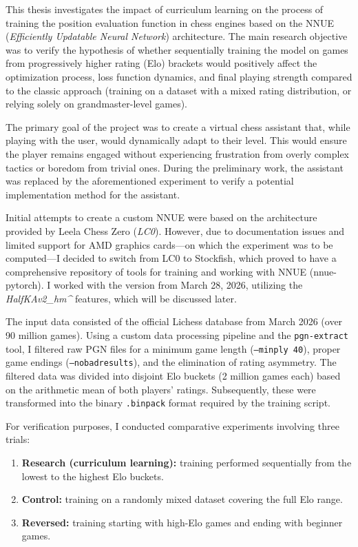 \documentclass[12pt,a4paper]{report}
\begin{document}
This thesis investigates the impact of curriculum learning on the process of training the position evaluation function in chess engines based on the NNUE (\textit{Efficiently Updatable Neural Network}) architecture. The main research objective was to verify the hypothesis of whether sequentially training the model on games from progressively higher rating (Elo) brackets would positively affect the optimization process, loss function dynamics, and final playing strength compared to the classic approach (training on a dataset with a mixed rating distribution, or relying solely on grandmaster-level games).

The primary goal of the project was to create a virtual chess assistant that, while playing with the user, would dynamically adapt to their level. This would ensure the player remains engaged without experiencing frustration from overly complex tactics or boredom from trivial ones. During the preliminary work, the assistant was replaced by the aforementioned experiment to verify a potential implementation method for the assistant.

Initial attempts to create a custom NNUE were based on the architecture provided by Leela Chess Zero (\textit{LC0}). However, due to documentation issues and limited support for AMD graphics cards—on which the experiment was to be computed—I decided to switch from LC0 to Stockfish, which proved to have a comprehensive repository of tools for training and working with NNUE (nnue-pytorch). I worked with the version from March 28, 2026, utilizing the \textit{HalfKAv2\_hm\string^} features, which will be discussed later.

The input data consisted of the official Lichess database from March 2026 (over 90 million games). Using a custom data processing pipeline and the \texttt{pgn-extract} tool, I filtered raw PGN files for a minimum game length (\texttt{--minply 40}), proper game endings (\texttt{--nobadresults}), and the elimination of rating asymmetry. The filtered data was divided into disjoint Elo buckets (2 million games each) based on the arithmetic mean of both players' ratings. Subsequently, these were transformed into the binary \texttt{.binpack} format required by the training script.

For verification purposes, I conducted comparative experiments involving three trials:
\begin{enumerate}
    \item \textbf{Research (curriculum learning):} training performed sequentially from the lowest to the highest Elo buckets.
    \item \textbf{Control:} training on a randomly mixed dataset covering the full Elo range.
    \item \textbf{Reversed:} training starting with high-Elo games and ending with beginner games.
\end{enumerate}
\end{document}
